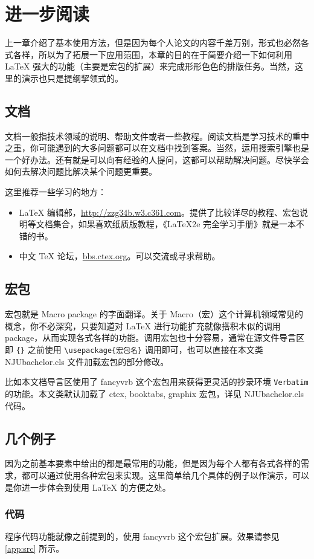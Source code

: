 \chapter{进一步阅读}
上一章介绍了基本使用方法，但是因为每个人论文的内容千差万别，形式也必然各式各样，所以为了拓展一下应用范围，本章的目的在于简要介绍一下如何利用 LaTeX 强大的功能（主要是宏包的扩展）来完成形形色色的排版任务。当然，这里的演示也只是提纲挈领式的。

\section{文档}
文档一般指技术领域的说明、帮助文件或者一些教程。阅读文档是学习技术的重中之重，你可能遇到的大多问题都可以在文档中找到答案。当然，运用搜索引擎也是一个好办法。还有就是可以向有经验的人提问，这都可以帮助解决问题。尽快学会如何去解决问题比解决某个问题更重要。

这里推荐一些学习的地方：
\begin{itemize}
	\item LaTeX 编辑部，\url{http://zzg34b.w3.c361.com}。提供了比较详尽的教程、宏包说明等文档集合，如果喜欢纸质版教程，《LaTeX2e 完全学习手册》就是一本不错的书。
	\item 中文 TeX 论坛，\url{bbs.ctex.org}。可以交流或寻求帮助。
\end{itemize}

\section{宏包}
宏包就是 Macro package 的字面翻译。关于 Macro（宏）这个计算机领域常见的概念，你不必深究，只要知道对 LaTeX 进行功能扩充就像搭积木似的调用 package，从而实现各式各样的功能\cite{latex2e}。调用宏包也十分容易，通常在源文件导言区即 \verb|{}| 之前使用 \verb|\usepackage{宏包名}| 调用即可，也可以直接在本文类 NJUbachelor.cls 文件加载宏包的部分修改。

比如本文档导言区使用了 fancyvrb 这个宏包用来获得更灵活的抄录环境 \verb|Verbatim| 的功能。本文类默认加载了 ctex, booktabs, graphix 宏包，详见 NJUbachelor.cls 代码。

\section{几个例子}
因为之前基本要素中给出的都是最常用的功能，但是因为每个人都有各式各样的需求，都可以通过使用各种宏包来实现。这里简单给几个具体的例子以作演示，可以是你进一步体会到使用 LaTeX 的方便之处。

\subsection{代码}
程序代码功能就像之前提到的，使用 fancyvrb 这个宏包扩展。效果请参见 \ref{app:src} 所示。

